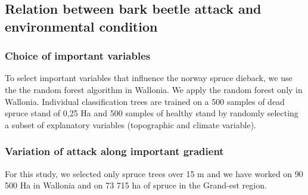 \documentclass[3p,procedia]{elsarticle}
\begin{document}



\subsection{Relation between bark beetle attack and environmental condition}

\subsubsection{Choice of important variables}

To select important variables that influence the norway spruce dieback, we use the the random forest algorithm \citep{genuer_vsurf_2015} in Wallonia.
We apply the random forest only in Wallonia.
Individual classification trees are trained on a 500 samples of dead spruce stand of 0,25 Ha and 500 samples of healthy stand by randomly selecting a subset of explanatory variables (topographic and  climate variable).


\subsubsection{Variation of attack along important gradient}
For this study, we selected only spruce trees over 15 m and we have worked on 90 500 Ha in Wallonia and  on 73 715 ha of spruce in the Grand-est region.  
			


\end{document}
